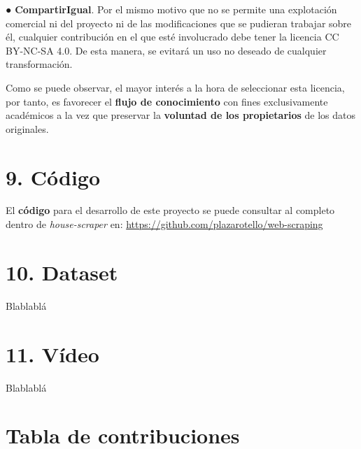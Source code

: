 \documentclass[12pt]{article}
\begin{document}
● \textbf{CompartirIgual}. Por el mismo motivo que no se permite una explotación comercial ni del proyecto ni de las modificaciones que se pudieran trabajar sobre él, cualquier contribución en el que esté involucrado debe tener la licencia CC BY-NC-SA 4.0. De esta manera, se evitará un uso no deseado de cualquier transformación.

Como se puede observar, el mayor interés a la hora de seleccionar esta licencia, por tanto, es favorecer el \textbf{flujo de conocimiento} con fines exclusivamente académicos a la vez que preservar la\textbf{ voluntad de los propietarios} de los datos originales. 

\section*{9. Código }\vspace{-1.5em}

El \textbf{código} para el desarrollo de este proyecto se puede consultar al completo dentro de \textit{house-scraper} en: \url{https://github.com/plazarotello/web-scraping}

\section*{10. Dataset }\vspace{-1.5em}

Blablablá

\section*{11. Vídeo }\vspace{-1.5em}

Blablablá

\section*{ Tabla de contribuciones }\vspace{-1.5em}
\end{document}
